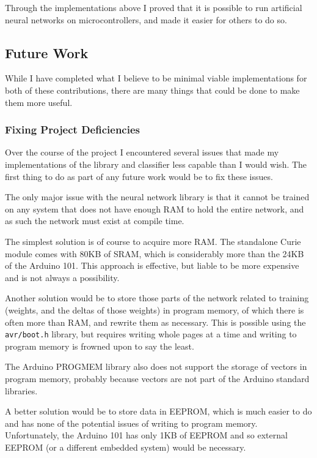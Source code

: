 \documentclass[a4paper]{article}
\begin{document}
Through the implementations above I proved that it is possible to run artificial neural networks on microcontrollers, and made it easier for others to do so.

\subsection{Future Work}%
\label{subsec:fw_futurework}

While I have completed what I believe to be minimal viable implementations for both of these contributions, there are many things that could be done to make them more useful.

\subsubsection{Fixing Project Deficiencies}

Over the course of the project I encountered several issues that made my implementations of the library and classifier less capable than I would wish. The first thing to do as part of any future work would be to fix these issues.

The only major issue with the neural network library is that it cannot be trained on any system that does not have enough RAM to hold the entire network, and as such the network must exist at compile time.

The simplest solution is of course to acquire more RAM. The standalone Curie module comes with 80KB of SRAM\cite{fwref2}, which is considerably more than the 24KB of the Arduino 101. This approach is effective, but liable to be more expensive and is not always a possibility.

Another solution would be to store those parts of the network related to training (weights, and the deltas of those weights) in program memory, of which there is often more than RAM, and rewrite them as necessary. This is possible using the \lstinline{avr/boot.h} library, but requires writing whole pages at a time and writing to program memory is frowned upon to say the least.\cite{fwref0}

The Arduino PROGMEM library also does not support the storage of vectors in program memory, probably because vectors are not part of the Arduino standard libraries.

A better solution would be to store data in EEPROM, which is much easier to do and has none of the potential issues of writing to program memory.\cite{fwref1} Unfortunately, the Arduino 101 has only 1KB of EEPROM and so external EEPROM (or a different embedded system) would be necessary.
\end{document}
